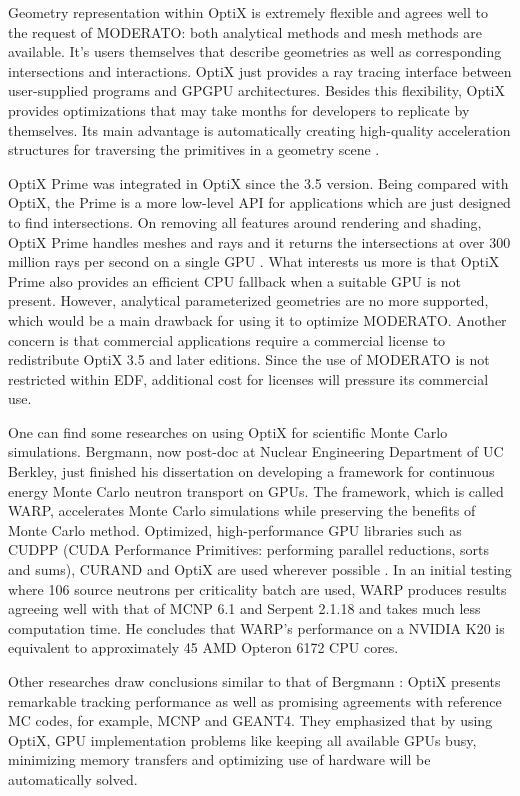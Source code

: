 Geometry representation within OptiX is extremely flexible and agrees well to the request of MODERATO: both analytical methods and mesh methods are available. It's users themselves that describe geometries as well as corresponding intersections and interactions. OptiX just provides a ray tracing interface between user-supplied programs and GPGPU architectures. Besides this flexibility, OptiX provides optimizations that may take months for developers to replicate by themselves. Its main advantage is automatically creating high-quality acceleration structures for traversing the primitives in a geometry scene \citep{Reference6}.

OptiX Prime was integrated in OptiX since the 3.5 version. Being compared with OptiX, the Prime is a more low-level API for applications which are just designed to find intersections. On removing all features around rendering and shading, OptiX Prime handles meshes and rays and it returns the intersections at over 300 million rays per second on a single GPU \citep{optixgroup}. What interests us more is that OptiX Prime also provides an efficient CPU fallback when a suitable GPU is not present. However, analytical parameterized geometries are no more supported, which would be a main drawback for using it to optimize MODERATO. Another concern is that commercial applications require a commercial license to redistribute OptiX 3.5 and later editions. Since the use of MODERATO is not restricted within EDF, additional cost for licenses will pressure its commercial use.

One can find some researches on using OptiX for scientific Monte Carlo simulations. Bergmann, now post-doc at Nuclear Engineering Department of UC Berkley, just finished his dissertation on developing a framework for continuous energy Monte Carlo neutron transport on GPUs. The framework, which is called WARP, accelerates Monte Carlo simulations while preserving the benefits of Monte Carlo method. Optimized, high-performance GPU libraries such as CUDPP (CUDA Performance Primitives: performing parallel reductions, sorts and sums), CURAND and OptiX are used wherever possible \citep{Reference2}. In an initial testing where 106 source neutrons per criticality batch are used, WARP produces results agreeing well with that of MCNP 6.1 and Serpent 2.1.18 and takes much less computation time. He concludes that WARP’s performance on a NVIDIA K20 is equivalent to approximately 45 AMD Opteron 6172 CPU cores. 

Other researches draw conclusions similar to that of Bergmann \citep{gpuconf, Safari2014101}: OptiX presents remarkable tracking performance as well as promising agreements with reference MC codes, for example, MCNP and GEANT4. They emphasized that by using OptiX, GPU implementation problems like keeping all available GPUs busy, minimizing memory transfers and optimizing use of hardware will be automatically solved.

